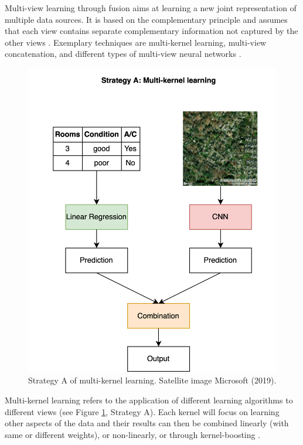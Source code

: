\documentclass[letterpaper]{article}
\begin{document}
Multi-view learning through fusion aims at learning a new joint representation of multiple data sources. It is based on the complementary principle and assumes that each view contains separate complementary information not captured by the other views \cite{xu2013survey}. Exemplary techniques are multi-kernel learning, multi-view concatenation, and different types of multi-view neural networks \cite{li2018survey, xu2013survey}.

\begin{figure}[!b]
\centering
\includegraphics[width=0.9\columnwidth]{StrategyA.png} %
\caption{Strategy A of multi-kernel learning. Satellite image \textcopyright \space Microsoft (2019).}
\label{strategyA}
\end{figure}

Multi-kernel learning refers to the application of different learning algorithms to different views (see Figure \ref{strategyA}, Strategy A). Each kernel will focus on learning other aspects of the data and their results can then be combined linearly (with same or different weights), or non-linearly, or through kernel-boosting \cite{xu2013survey}.
\end{document}
